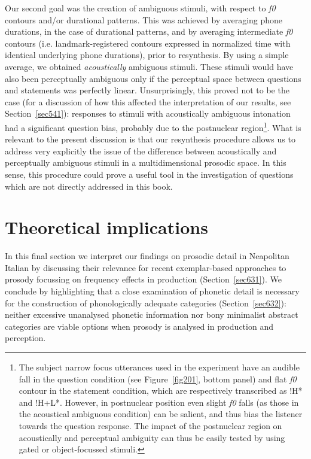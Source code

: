 Our second goal was the creation of ambiguous stimuli, with respect to \textit{f0} contours and/or durational patterns. This was achieved by averaging phone durations, in the case of durational patterns, and by averaging intermediate \textit{f0} contours (i.e. landmark-registered contours expressed in normalized time with identical underlying phone durations), prior to resynthesis. By using a simple average, we obtained \textit{acoustically} ambiguous stimuli. These stimuli would have also been perceptually ambiguous only if the perceptual space between questions and statements was perfectly linear. Unsurprisingly, this proved not to be the case (for a discussion of how this affected the interpretation of our results, see Section~\ref{sec541}): responses to stimuli with acoustically ambiguous intonation had a significant question bias, probably due to the postnuclear region\footnote{The subject narrow focus utterances used in the experiment have an audible fall in the question condition (see Figure~\ref{fig201}, bottom panel) and flat \textit{f0} contour in the statement condition, which are respectively transcribed as !H* and !H+L*. However, in postnuclear position even slight \textit{f0} falls (as those in the acoustical ambiguous condition) can be salient, and thus bias the listener towards the question response. The impact of the postnuclear region on acoustically and perceptual ambiguity can thus be easily tested by using gated or object-focussed stimuli.}. What is relevant to the present discussion is that our resynthesis procedure allows us to address very explicitly the issue of the difference between acoustically and perceptually ambiguous stimuli in a multidimensional prosodic space. In this sense, this procedure could prove a useful tool in the investigation of questions which are not directly addressed in this book.

\section{Theoretical implications}\label{sec63}
In this final section we interpret our findings on prosodic detail in Neapolitan Italian by discussing their relevance for recent exemplar-based approaches to prosody focussing on frequency effects in production (Section~\ref{sec631}). We conclude by highlighting that a close examination of phonetic detail is necessary for the construction of phonologically adequate categories (Section~\ref{sec632}): neither excessive unanalysed phonetic information nor bony minimalist abstract categories are viable options when prosody is analysed in production and perception.

